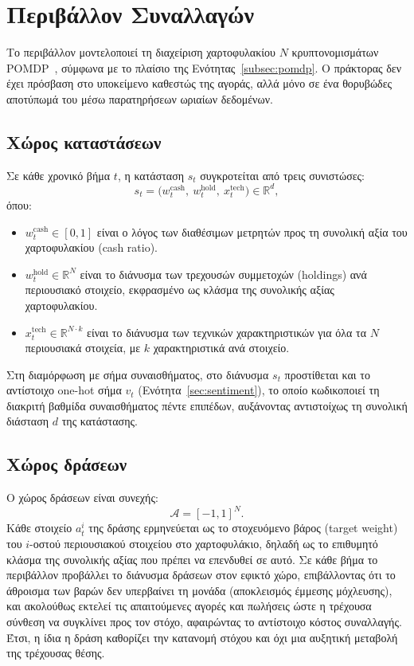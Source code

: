 \section{Περιβάλλον Συναλλαγών}
\label{sec:env}

Το περιβάλλον μοντελοποιεί τη διαχείριση χαρτοφυλακίου $N$ κρυπτονομισμάτων 
POMDP~\cite{kaelbling1998pomdp},
σύμφωνα με το πλαίσιο της Ενότητας~\ref{subsec:pomdp}. Ο πράκτορας δεν έχει πρόσβαση στο
υποκείμενο καθεστώς της αγοράς, αλλά μόνο σε ένα θορυβώδες αποτύπωμά του μέσω
παρατηρήσεων ωριαίων δεδομένων.

\subsection{Χώρος καταστάσεων}

Σε κάθε χρονικό βήμα $t$, η κατάσταση $s_t$ συγκροτείται από τρεις
συνιστώσες:
\begin{equation}
  s_t = \bigl(w^{\mathrm{cash}}_t,\ w^{\mathrm{hold}}_t,\ x^{\mathrm{tech}}_t\bigr) \in \mathbb{R}^{d},
  \label{eq:obs}
\end{equation}
όπου:
\begin{itemize}
  \item $w^{\mathrm{cash}}_t \in [0, 1]$ είναι ο λόγος των διαθέσιμων μετρητών
        προς τη συνολική αξία του χαρτοφυλακίου (cash ratio).
  \item $w^{\mathrm{hold}}_t \in \mathbb{R}^{N}$ είναι το διάνυσμα των
        τρεχουσών συμμετοχών (holdings) ανά περιουσιακό στοιχείο, εκφρασμένο
        ως κλάσμα της συνολικής αξίας χαρτοφυλακίου.
  \item $x^{\mathrm{tech}}_t \in \mathbb{R}^{N \cdot k}$ είναι το διάνυσμα των
        τεχνικών χαρακτηριστικών για όλα τα $N$ περιουσιακά στοιχεία, με $k$
        χαρακτηριστικά ανά στοιχείο.
\end{itemize}
Στη διαμόρφωση με σήμα συναισθήματος, στο διάνυσμα $s_t$ προστίθεται και το
αντίστοιχο one-hot σήμα $v_t$ (Ενότητα~\ref{sec:sentiment}), το οποίο
κωδικοποιεί τη διακριτή βαθμίδα συναισθήματος πέντε επιπέδων, αυξάνοντας
αντιστοίχως τη συνολική διάσταση $d$ της κατάστασης.

\subsection{Χώρος δράσεων}

Ο χώρος δράσεων είναι συνεχής:
\begin{equation}
  \mathcal{A} = [-1, 1]^{N}.
  \label{eq:action}
\end{equation}
Κάθε στοιχείο $a^{i}_t$ της δράσης ερμηνεύεται ως το στοχευόμενο βάρος (target
weight) του $i$-οστού περιουσιακού στοιχείου στο χαρτοφυλάκιο, δηλαδή ως το
επιθυμητό κλάσμα της συνολικής αξίας που πρέπει να επενδυθεί σε αυτό. Σε κάθε
βήμα το περιβάλλον προβάλλει το διάνυσμα δράσεων στον εφικτό χώρο,
επιβάλλοντας ότι το άθροισμα των βαρών δεν υπερβαίνει τη μονάδα (αποκλεισμός
έμμεσης μόχλευσης), και ακολούθως εκτελεί τις απαιτούμενες αγορές και πωλήσεις
ώστε η τρέχουσα σύνθεση να συγκλίνει προς τον στόχο, αφαιρώντας το αντίστοιχο
κόστος συναλλαγής. Έτσι, η ίδια η δράση καθορίζει την κατανομή στόχου και όχι
μια αυξητική μεταβολή της τρέχουσας θέσης.

